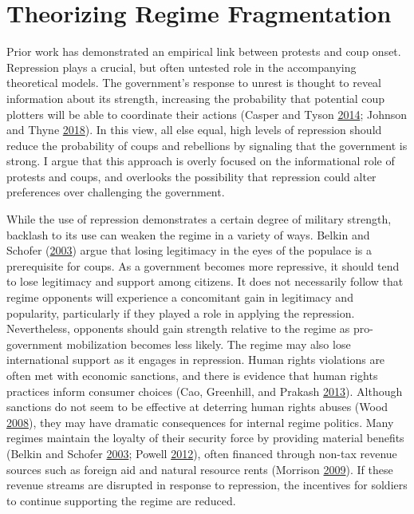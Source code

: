 \documentclass[12pt,]{article}
\theoremstyle{definition}
\theoremstyle{definition}
\theoremstyle{definition}
\theoremstyle{remark}
\begin{document}
\hypertarget{theorizing-regime-fragmentation}{%
\section{Theorizing Regime
Fragmentation}\label{theorizing-regime-fragmentation}}

Prior work has demonstrated an empirical link between protests and coup
onset. Repression plays a crucial, but often untested role in the
accompanying theoretical models. The government's response to unrest is
thought to reveal information about its strength, increasing the
probability that potential coup plotters will be able to coordinate
their actions (Casper and Tyson
\protect\hyperlink{ref-Casper2014}{2014}; Johnson and Thyne
\protect\hyperlink{ref-Johnson2018}{2018}). In this view, all else
equal, high levels of repression should reduce the probability of coups
and rebellions by signaling that the government is strong. I argue that
this approach is overly focused on the informational role of protests
and coups, and overlooks the possibility that repression could alter
preferences over challenging the government.

While the use of repression demonstrates a certain degree of military
strength, backlash to its use can weaken the regime in a variety of
ways. Belkin and Schofer (\protect\hyperlink{ref-Belkin2003}{2003})
argue that losing legitimacy in the eyes of the populace is a
prerequisite for coups. As a government becomes more repressive, it
should tend to lose legitimacy and support among citizens. It does not
necessarily follow that regime opponents will experience a concomitant
gain in legitimacy and popularity, particularly if they played a role in
applying the repression. Nevertheless, opponents should gain strength
relative to the regime as pro-government mobilization becomes less
likely. The regime may also lose international support as it engages in
repression. Human rights violations are often met with economic
sanctions, and there is evidence that human rights practices inform
consumer choices (Cao, Greenhill, and Prakash
\protect\hyperlink{ref-Cao2013}{2013}). Although sanctions do not seem
to be effective at deterring human rights abuses (Wood
\protect\hyperlink{ref-Wood2008a}{2008}), they may have dramatic
consequences for internal regime politics. Many regimes maintain the
loyalty of their security force by providing material benefits (Belkin
and Schofer \protect\hyperlink{ref-Belkin2003}{2003}; Powell
\protect\hyperlink{ref-Powell2012a}{2012}), often financed through
non-tax revenue sources such as foreign aid and natural resource rents
(Morrison \protect\hyperlink{ref-Morrison2009}{2009}). If these revenue
streams are disrupted in response to repression, the incentives for
soldiers to continue supporting the regime are reduced.
\end{document}

